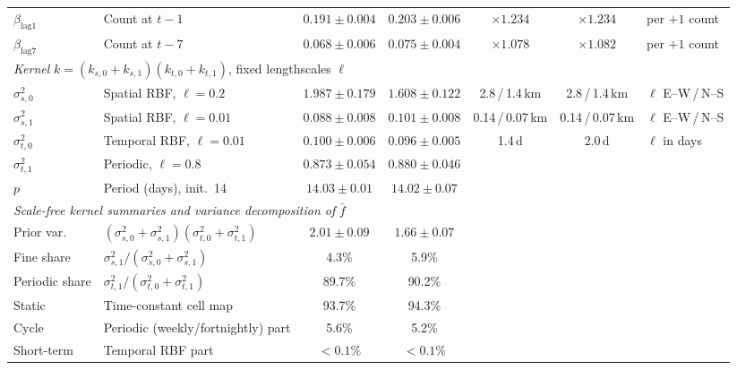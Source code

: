 \begin{table}[t]
\begin{tabular}{llccccl}
$\beta_{\mathrm{lag}1}$ & Count at $t-1$ & $0.191 \pm 0.004$ & $0.203 \pm 0.006$ & $\times1.234$ & $\times1.234$ & per $+1$ count \\
$\beta_{\mathrm{lag}7}$ & Count at $t-7$ & $0.068 \pm 0.006$ & $0.075 \pm 0.004$ & $\times1.078$ & $\times1.082$ & per $+1$ count \\
\midrule
\multicolumn{7}{l}{\textit{Kernel} $k=(k_{s,0}+k_{s,1})(k_{t,0}+k_{t,1})$, fixed lengthscales $\ell$} \\
$\sigma^2_{s,0}$ & Spatial RBF, $\ell{=}0.2$ & $1.987 \pm 0.179$ & $1.608 \pm 0.122$ & 2.8\,/\,1.4\,km & 2.8\,/\,1.4\,km & $\ell$ E--W\,/\,N--S \\
$\sigma^2_{s,1}$ & Spatial RBF, $\ell{=}0.01$ & $0.088 \pm 0.008$ & $0.101 \pm 0.008$ & 0.14\,/\,0.07\,km & 0.14\,/\,0.07\,km & $\ell$ E--W\,/\,N--S \\
$\sigma^2_{t,0}$ & Temporal RBF, $\ell{=}0.01$ & $0.100 \pm 0.006$ & $0.096 \pm 0.005$ & 1.4\,d & 2.0\,d & $\ell$ in days \\
$\sigma^2_{t,1}$ & Periodic, $\ell{=}0.8$ & $0.873 \pm 0.054$ & $0.880 \pm 0.046$ &  &  &  \\
$p$ & Period (days), init.\ 14 & $14.03 \pm 0.01$ & $14.02 \pm 0.07$ &  &  &  \\
\midrule
\multicolumn{7}{l}{\textit{Scale-free kernel summaries and variance decomposition of} $\bar f$} \\
Prior var. & $(\sigma^2_{s,0}{+}\sigma^2_{s,1})(\sigma^2_{t,0}{+}\sigma^2_{t,1})$ & $2.01 \pm 0.09$ & $1.66 \pm 0.07$ &  &  &  \\
Fine share & $\sigma^2_{s,1}/(\sigma^2_{s,0}{+}\sigma^2_{s,1})$ & 4.3\% & 5.9\% &  &  &  \\
Periodic share & $\sigma^2_{t,1}/(\sigma^2_{t,0}{+}\sigma^2_{t,1})$ & 89.7\% & 90.2\% &  &  &  \\
Static & Time-constant cell map & 93.7\% & 94.3\% &  &  &  \\
Cycle & Periodic (weekly/fortnightly) part & 5.6\% & 5.2\% &  &  &  \\
Short-term & Temporal RBF part & ${<}0.1\%$ & ${<}0.1\%$ &  &  &  \\
\bottomrule
\end{tabular}
\end{table}

